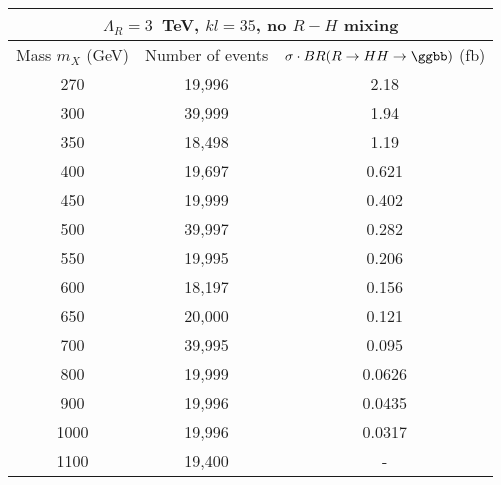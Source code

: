 \begin{tabular}{|c|c|c|}
\hline
\multicolumn{3}{|c|}{ $\Lambda_R = 3$~TeV, $kl = 35$, no $R-H$ mixing}\\ \hline \hline
Mass $m_X$ (GeV) & Number of events & $\sigma \cdot BR(R\rightarrow HH \rightarrow \ggbb)$ (fb) \\
\hline
270 & 19,996& 2.18 \\
300 & 39,999& 1.94\\
350 & 18,498& 1.19 \\
400 & 19,697& 0.621 \\
450 & 19,999& 0.402 \\
500 & 39,997& 0.282 \\
550 & 19,995& 0.206 \\
600 & 18,197& 0.156 \\
650 & 20,000& 0.121 \\
700 & 39,995& 0.095 \\
800 & 19,999& 0.0626 \\
900 & 19,996& 0.0435 \\
1000& 19,996& 0.0317\\
1100& 19,400& - \\
\hline
\end{tabular}
